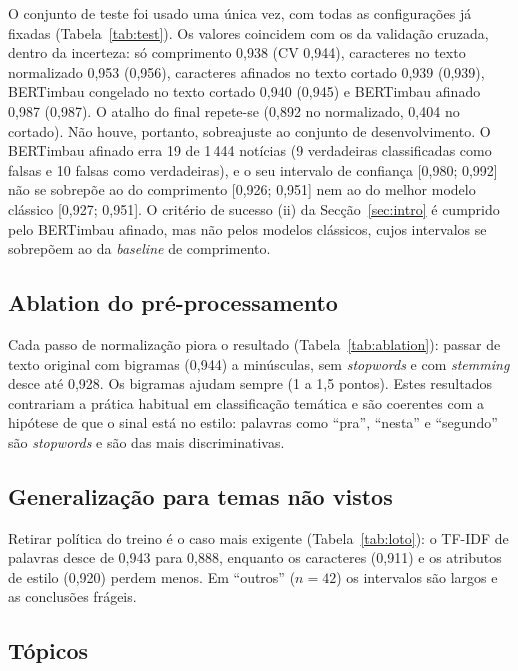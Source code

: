 
O conjunto de teste foi usado uma única vez, com todas as configurações já fixadas
(Tabela~\ref{tab:test}). Os valores coincidem com os da validação cruzada, dentro da incerteza: só
comprimento 0,938 (CV 0,944), caracteres no texto normalizado 0,953 (0,956), caracteres afinados no
texto cortado 0,939 (0,939), BERTimbau congelado no texto cortado 0,940 (0,945) e BERTimbau afinado
0,987 (0,987). O atalho do final repete-se (0,892 no normalizado, 0,404 no cortado). Não houve,
portanto, sobreajuste ao conjunto de desenvolvimento. O BERTimbau afinado erra 19 de 1\,444 notícias
(9 verdadeiras classificadas como falsas e 10 falsas como verdadeiras), e o seu intervalo de
confiança [0,980; 0,992] não se sobrepõe ao do comprimento [0,926; 0,951] nem ao do melhor modelo
clássico [0,927; 0,951]. O critério de sucesso (ii) da Secção~\ref{sec:intro} é cumprido pelo
BERTimbau afinado, mas não pelos modelos clássicos, cujos intervalos se sobrepõem ao da
\emph{baseline} de comprimento.

\subsection{Ablation do pré-processamento}



Cada passo de normalização piora o resultado (Tabela~\ref{tab:ablation}): passar de texto
original com bigramas (0,944) a minúsculas, sem \emph{stopwords} e com \emph{stemming} desce até
0,928. Os bigramas ajudam sempre (1 a 1,5 pontos). Estes resultados contrariam a prática habitual
em classificação temática e são coerentes com a hipótese de que o sinal está no estilo: palavras
como ``pra'', ``nesta'' e ``segundo'' são \emph{stopwords} e são das mais discriminativas.

\subsection{Generalização para temas não vistos}



Retirar política do treino é o caso mais exigente (Tabela~\ref{tab:loto}): o TF-IDF de palavras
desce de 0,943 para 0,888, enquanto os caracteres (0,911) e os atributos de estilo (0,920) perdem
menos. Em ``outros'' ($n=42$) os intervalos são largos e as conclusões frágeis.

\subsection{Tópicos}

